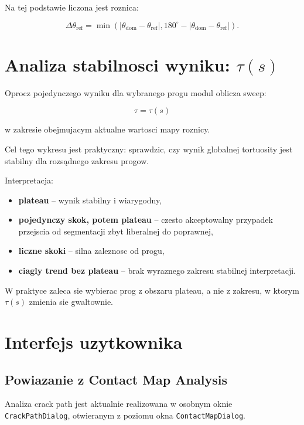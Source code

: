 \documentclass[11pt,a4paper]{article}
\begin{document}
Na tej podstawie liczona jest roznica:

\begin{equation}
    \Delta \theta_{\mathrm{ref}} =
    \min\left(
        |\theta_{\mathrm{dom}} - \theta_{\mathrm{ref}}|,
        180^\circ - |\theta_{\mathrm{dom}} - \theta_{\mathrm{ref}}|
    \right).
\end{equation}

\section{Analiza stabilnosci wyniku: \(\tau(s)\)}

Oprocz pojedynczego wyniku dla wybranego progu modul oblicza sweep:

\begin{equation}
    \tau = \tau(s)
\end{equation}

w zakresie obejmujacym aktualne wartosci mapy roznicy.

Cel tego wykresu jest praktyczny: sprawdzic, czy wynik globalnej tortuosity
jest stabilny dla rozsądnego zakresu progow.

Interpretacja:

\begin{itemize}[leftmargin=1.5em]
    \item \textbf{plateau} -- wynik stabilny i wiarygodny,
    \item \textbf{pojedynczy skok, potem plateau} -- czesto akceptowalny
    przypadek przejscia od segmentacji zbyt liberalnej do poprawnej,
    \item \textbf{liczne skoki} -- silna zaleznosc od progu,
    \item \textbf{ciagly trend bez plateau} -- brak wyraznego zakresu stabilnej
    interpretacji.
\end{itemize}

W praktyce zaleca sie wybierac prog z obszaru plateau, a nie z zakresu, w
ktorym \(\tau(s)\) zmienia sie gwaltownie.

\section{Interfejs uzytkownika}

\subsection{Powiazanie z Contact Map Analysis}

Analiza crack path jest aktualnie realizowana w osobnym oknie
\texttt{CrackPathDialog}, otwieranym z poziomu okna
\texttt{ContactMapDialog}.
\end{document}
